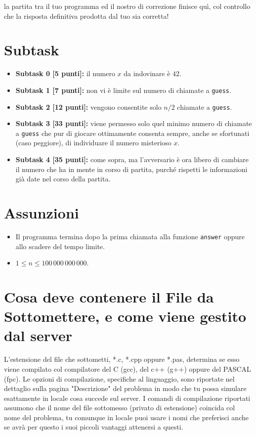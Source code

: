 \documentclass[a4paper,11pt]{article}
\begin{document}
  \vspace{0.2cm}
  
  \noindent
  la partita tra il tuo programma ed il nostro di correzione finisce quì,
  col controllo che la risposta definitiva prodotta dal tuo sia corretta!
  
  \section*{Subtask}
  \begin{itemize}
    \item \textbf{Subtask 0 [5 punti]:} il numero $x$ da indovinare è $42$.
    \item \textbf{Subtask 1 [7 punti]:} non vi è limite sul numero di chiamate a \texttt{guess}.
    \item \textbf{Subtask 2 [12 punti]:} vengono consentite solo $n/2$ chiamate a \texttt{guess}.
    \item \textbf{Subtask 3 [33 punti]:} viene permesso solo quel minimo numero di chiamate a \texttt{guess} che pur di giocare ottimamente consenta sempre, anche se sfortunati (caso peggiore), di individuare il numero misterioso $x$.
    \item \textbf{Subtask 4 [35 punti]:} come sopra, ma l'avversario è ora libero di cambiare il numero che ha in mente in corso di partita, purché rispetti le informazioni già date nel corso della partita.
  \end{itemize}
  
  \section*{Assunzioni}
  \begin{itemize}[nolistsep, noitemsep]
    \item Il programma termina dopo la prima chiamata alla funzione \texttt{answer} oppure allo scadere del tempo limite.
    \item $1 \le n \le 100\,000\,000\,000$.
  \end{itemize}

  \section*{Cosa deve contenere il File da Sottomettere, e come viene gestito dal server}

  L'estensione del file che sottometti, *.c, *.cpp oppure *.pas,
  determina se esso viene compilato col compilatore del C (gcc),
  del c++ (g++) oppure del PASCAL (fpc).
  Le opzioni di compilazione, specifiche al linguaggio,
  sono riportate nel dettaglio sulla pagina "Descrizione" del problema
  in modo che tu possa simulare esattamente in locale cosa succede sul server.
  I comandi di compilazione riportati assumono che il nome del file sottomesso (privato di estensione) coincida col nome del problema, tu comunque in locale puoi usare i nomi che preferisci anche se avrà per questo i suoi piccoli vantaggi attenersi a questi.
\end{document}
